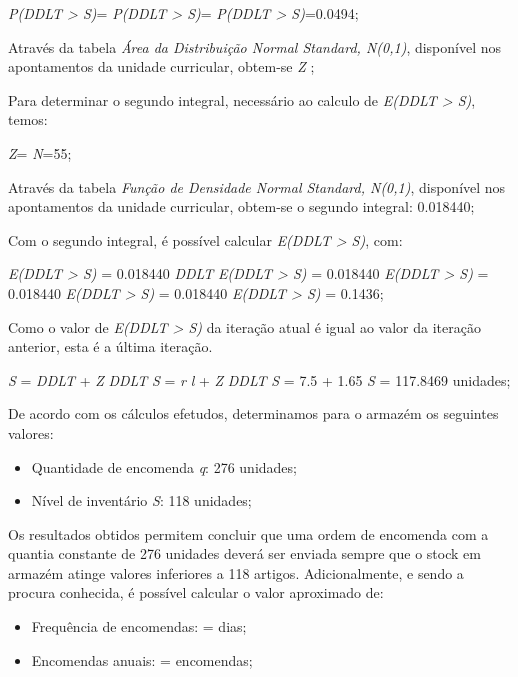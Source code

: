 \begin{itemize}
	\emph{P(DDLT > S)}=
	\emph{P(DDLT > S)}=
	\emph{P(DDLT > S)}=0.0494;

	Através da tabela \emph{Área da Distribuição Normal Standard, N(0,1)}, disponível nos apontamentos da unidade curricular, obtem-se \emph{Z} ;
	
	Para determinar o segundo integral, necessário ao calculo de \emph{E(DDLT > S)}, temos:
	
	\emph{Z}=
	\emph{N}=55;

	Através da tabela \emph{Função de Densidade Normal Standard, N(0,1)}, disponível nos apontamentos da unidade curricular, obtem-se o segundo integral: 0.018440;

	Com o segundo integral, é possível calcular \emph{E(DDLT > S)}, com:

	\emph{E(DDLT > S)} = 0.018440 \times \emph{\sigma}\emph{DDLT}
	\emph{E(DDLT > S)} = 0.018440 \times {}
	\emph{E(DDLT > S)} = 0.018440 \times {}
	\emph{E(DDLT > S)} = 0.018440 
	\emph{E(DDLT > S)} = 0.1436;

	Como o valor de \emph{E(DDLT > S)} da iteração atual é igual ao valor da iteração anterior, esta é a última iteração.

	\emph{S} = \emph{\mu}\emph{DDLT} + \emph{Z} \times \emph{\sigma}\emph{DDLT}
	\emph{S} = \emph{r} \times \emph{l} + \emph{Z} \times \emph{\sigma}\emph{DDLT}
	\emph{S} = 7.5  + 1.65 
	\emph{S} = 117.8469  unidades;

\end{itemize}

De acordo com os cálculos efetudos, determinamos para o armazém os seguintes valores:

\begin{itemize}
\item Quantidade de encomenda \emph{q}: 276 unidades;
\item Nível de inventário \emph{S}: 118 unidades;
\end{itemize}

Os resultados obtidos permitem concluir que uma ordem de encomenda com a quantia constante de 276 unidades deverá ser enviada sempre que o stock em armazém atinge valores inferiores a 118 artigos. Adicionalmente, e sendo a procura conhecida, é possível calcular o valor aproximado de:

\begin{itemize}
\item Frequência de encomendas:  =   dias;
\item Encomendas anuais:  =   encomendas;
\end{itemize}

